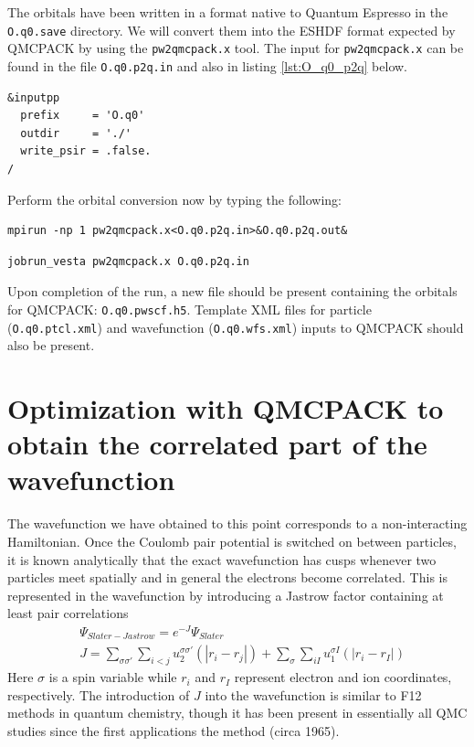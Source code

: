 The orbitals have been written in a format native to Quantum Espresso in the \texttt{O.q0.save} directory.  We will convert them into the ESHDF format expected by QMCPACK by using the \texttt{pw2qmcpack.x} tool.  The input for \texttt{pw2qmcpack.x} can be found in the file \texttt{O.q0.p2q.in} and also in listing \ref{lst:O_q0_p2q} below. 

\begin{lstlisting}[caption={\texttt{pw2qmcpack.x} input file for orbital conversion (\texttt{O.q0.p2q.in})\label{lst:O_q0_p2q}}]
&inputpp
  prefix     = 'O.q0'
  outdir     = './'
  write_psir = .false.
/
\end{lstlisting}

Perform the orbital conversion now by typing the following:
\ifws
\begin{shaded}
\begin{verbatim}
mpirun -np 1 pw2qmcpack.x<O.q0.p2q.in>&O.q0.p2q.out&
\end{verbatim}
\end{shaded}
\else
\begin{shaded}
\begin{verbatim}
jobrun_vesta pw2qmcpack.x O.q0.p2q.in
\end{verbatim}
\end{shaded}
\fi
\noindent
Upon completion of the run, a new file should be present containing the orbitals for QMCPACK: \texttt{O.q0.pwscf.h5}.  Template XML files for particle (\texttt{O.q0.ptcl.xml}) and wavefunction (\texttt{O.q0.wfs.xml}) inputs to QMCPACK should also be present.  


\section{Optimization with QMCPACK to obtain the correlated part of the wavefunction}\label{sec:optimization_walkthrough}
The wavefunction we have obtained to this point corresponds to a non-interacting Hamiltonian.  Once the Coulomb pair potential is switched on between particles, it is known analytically that the exact wavefunction has cusps whenever two particles meet spatially and in general the electrons become correlated.  This is represented in the wavefunction by introducing a Jastrow factor containing at least pair correlations
\begin{align}
  &\Psi_{Slater-Jastrow}=e^{-J}\Psi_{Slater} \\
  &J = \sum_{\sigma\sigma'}\sum_{i<j}u^{\sigma\sigma'}_2(|r_i-r_j|) + \sum_\sigma\sum_{iI}u^{\sigma I}_1(|r_i-r_I|)
\end{align}
Here $\sigma$ is a spin variable while $r_i$ and $r_I$ represent electron and ion coordinates, respectively.  The introduction of $J$ into the wavefunction is similar to F12 methods in quantum chemistry, though it has been present in essentially all QMC studies since the first applications the method (circa 1965).

